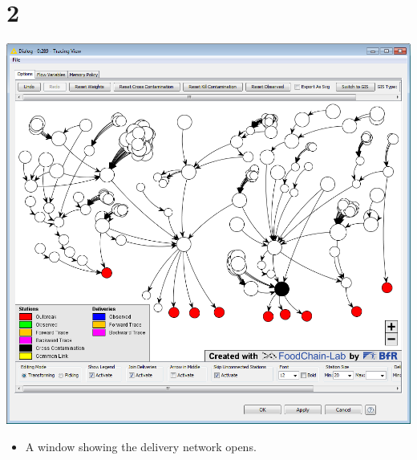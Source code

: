 \documentclass{beamer}
\begin{document}
\section{2}
\begin{frame}
	\begin{center}
  		\includegraphics[height=0.6\textheight]{2.png}
	\end{center}
	\begin{itemize}
		\item A window showing the delivery network opens.
	\end{itemize}
\end{frame}
\end{document}
